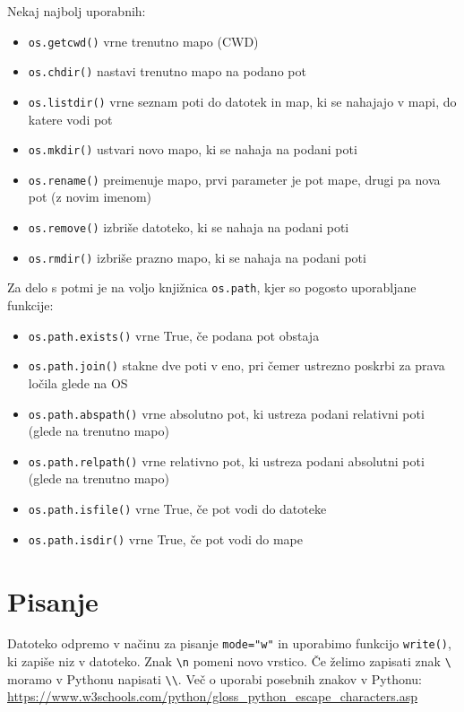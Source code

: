 \documentclass[
]{report}
\providecommand{\tightlist}{%
  \setlength{\itemsep}{0pt}\setlength{\parskip}{0pt}}
\begin{document}
Nekaj najbolj uporabnih:

\begin{itemize}
\tightlist
\item
  \texttt{os.getcwd()} vrne trenutno mapo (CWD)
\item
  \texttt{os.chdir()} nastavi trenutno mapo na podano pot
\item
  \texttt{os.listdir()} vrne seznam poti do datotek in map, ki se nahajajo v mapi, do katere vodi pot
\item
  \texttt{os.mkdir()} ustvari novo mapo, ki se nahaja na podani poti
\item
  \texttt{os.rename()} preimenuje mapo, prvi parameter je pot mape, drugi pa nova pot (z novim imenom)
\item
  \texttt{os.remove()} izbriše datoteko, ki se nahaja na podani poti
\item
  \texttt{os.rmdir()} izbriše prazno mapo, ki se nahaja na podani poti
\end{itemize}

Za delo s potmi je na voljo knjižnica \texttt{os.path}, kjer so pogosto uporabljane funkcije:

\begin{itemize}
\tightlist
\item
  \texttt{os.path.exists()} vrne True, če podana pot obstaja
\item
  \texttt{os.path.join()} stakne dve poti v eno, pri čemer ustrezno poskrbi za prava ločila glede na OS
\item
  \texttt{os.path.abspath()} vrne absolutno pot, ki ustreza podani relativni poti (glede na trenutno mapo)
\item
  \texttt{os.path.relpath()} vrne relativno pot, ki ustreza podani absolutni poti (glede na trenutno mapo)
\item
  \texttt{os.path.isfile()} vrne True, če pot vodi do datoteke
\item
  \texttt{os.path.isdir()} vrne True, če pot vodi do mape
\end{itemize}

\hypertarget{pisanje}{%
\section{Pisanje}\label{pisanje}}

Datoteko odpremo v načinu za pisanje \texttt{mode="w"} in uporabimo funkcijo \texttt{write()},
ki zapiše niz v datoteko. Znak \texttt{\textbackslash{}n} pomeni novo vrstico. Če želimo zapisati znak \texttt{\textbackslash{}} moramo v Pythonu napisati \texttt{\textbackslash{}\textbackslash{}}. Več o uporabi posebnih znakov v Pythonu: \url{https://www.w3schools.com/python/gloss_python_escape_characters.asp}
\end{document}
